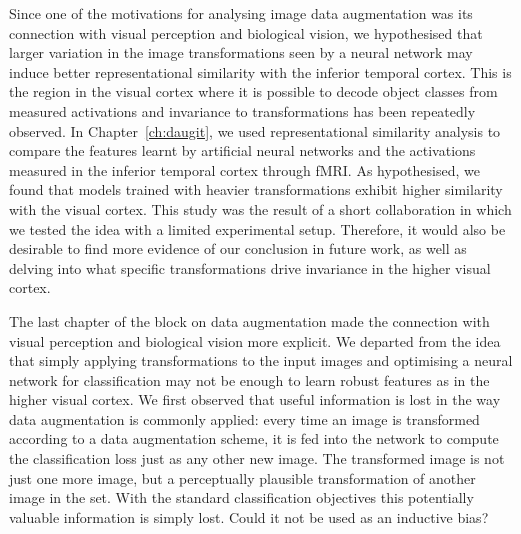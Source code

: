 {Since one of the motivations for analysing image data augmentation was its connection with visual perception and biological vision, we hypothesised that larger variation in the image transformations seen by a neural network may induce better representational similarity with the inferior temporal cortex. This is the region in the visual cortex where it is possible to decode object classes from measured activations and invariance to transformations has been repeatedly observed. In Chapter~\ref{ch:daugit}, we used representational similarity analysis to compare the features learnt by artificial neural networks and the activations measured in the inferior temporal cortex through fMRI. As hypothesised, we found that models trained with heavier transformations exhibit higher similarity with the visual cortex. This study was the result of a short collaboration in which we tested the idea with a limited experimental setup. Therefore, it would also be desirable to find more evidence of our conclusion in future work, as well as delving into what specific transformations drive invariance in the higher visual cortex.

The last chapter of the block on data augmentation made the connection with visual perception and biological vision more explicit. We departed from the idea that simply applying transformations to the input images and optimising a neural network for classification may not be enough to learn robust features as in the higher visual cortex. We first observed that useful information is lost in the way data augmentation is commonly applied: every time an image is transformed according to a data augmentation scheme, it is fed into the network to compute the classification loss just as any other new image. The transformed image is not just one more image, but a perceptually plausible transformation of another image in the set. With the standard classification objectives this potentially valuable information is simply lost. Could it not be used as an inductive bias?

}
